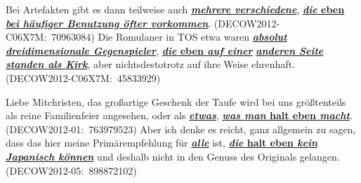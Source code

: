 \begin{exe}
	\ex\label{747} 
		\begin{xlist}	
		\ex\label{747a} 
		\scriptsize
		Bei Artefakten gibt es dann teilweise auch \underline{\textbf{\textit{mehrere verschiedene}}}, 									\underline{\textbf{\textit{die} eben \textit{bei häufiger Benut}}}\-\underline{\textbf{\textit{zung öfter vorkommen}}}.       
	 	\hfill\hbox{(DECOW2012-C06X7M: 70963084)}
	 	\newline
	 	\hbox{}\hfill\hbox{\citet[168]{Mueller2016a}}
	 	\ex\label{747b} 
	 	\scriptsize
	 	Die Romulaner in TOS etwa waren \underline{\textbf{\textit{absolut dreidimensionale Gegenspieler}}}, 							\underline{\textbf{\textit{die} eben \textit{auf einer}}} \underline{\textit{\textbf{anderen Seite standen als Kirk}}}, 		aber nichtsdestotrotz auf ihre Weise ehrenhaft. 	              
		\newline
	 	\hbox{}\hfill\hbox{(DECOW2012-C06X7M: 45833929)}
		\end{xlist}
\end{exe}

\begin{exe}
	\ex\label{748} 
		\begin{xlist}	
		\ex\label{748a} 
		\scriptsize
		Liebe Mitchristen, das großartige Geschenk der Taufe wird bei uns größtenteils
		als reine Familienfeier angesehen, oder als \underline{\textbf{\textit{etwas}}}, \underline{\textbf{\textit{was man} 			halt eben \textit{macht}}}. 
	 	\hfill\hbox{(DECOW2012-01: 763979523)}
	 	\newline
	 	\hbox{}\hfill\hbox{\citet[168]{Mueller2016a}}
	 	\ex\label{748b} 
	 	\scriptsize
	 	Aber ich denke es reicht, ganz allgemein zu sagen, dass das hier meine Primärempfehlung für 									\underline{\textbf{\textit{alle}}} ist, \underline{\textbf{\textit{die} halt eben \textit{kein Japanisch können}}} und 			deshalb nicht in den Genuss des Originals gelangen.                                                                      
		\hfill\hbox{(DECOW2012-05: 898872102)}
		\end{xlist}
\end{exe}

